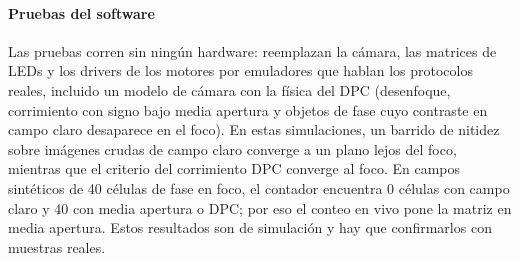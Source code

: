 \documentclass[preprint,12pt]{elsarticle}
\begin{document}
\paragraph{Pruebas del software} Las pruebas corren sin ningún hardware:
reemplazan la cámara, las matrices de LEDs y los drivers de los motores por
emuladores que hablan los protocolos reales, incluido un modelo de cámara
con la física del DPC (desenfoque, corrimiento con signo bajo media
apertura y objetos de fase cuyo contraste en campo claro desaparece en el
foco). En estas simulaciones, un barrido de nitidez sobre imágenes crudas
de campo claro converge a un plano lejos del foco, mientras que el
criterio del corrimiento DPC converge al foco. En campos sintéticos de 40
células de fase en foco, el contador encuentra 0 células con campo claro y
40 con media apertura o DPC; por eso el conteo en vivo pone la matriz en
media apertura. Estos resultados son de simulación y hay que confirmarlos
con muestras reales.
\end{document}
